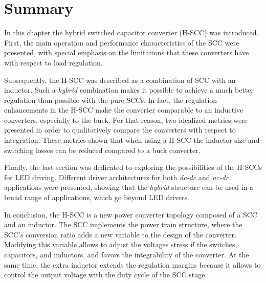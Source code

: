 \section{Summary}

In this chapter the hybrid switched capacitor converter (H-SCC) was introduced. First, the main operation and performance characteristics of the SCC were presented, with special emphasis on the limitations that these converters have with respect to load  regulation.

Subsequently, the H-SCC was described as a combination of SCC with an inductor. Such a \emph{hybrid} combination makes it possible to achieve a much better regulation than possible with the pure SCCs. In fact, the regulation enhancements in the H-SCC make the converter comparable to an inductive converters, especially to the buck. For that reason, two idealized metrics were presented in order to qualitatively compare the converters with respect to integration. These metrics shown that when using a H-SCC the inductor size and switching losses can be reduced compared to a buck converter.

Finally, the last section was dedicated to exploring the possibilities of the H-SCCs for LED driving. Different driver architectures for both \emph{dc-dc} and \emph{ac-dc} applications were presented, showing that the \emph{hybrid} structure can be used in a broad range of applications, which go beyond LED drivers.

In conclusion, the H-SCC is a new power converter topology composed of a SCC and an inductor. The SCC implements the power train structure, where the SCC's conversion ratio adds a new variable to the design of the converter. Modifying this variable allows to adjust the voltages stress if the switches, capacitors, and inductors, and favors the integrability of the converter. At the same time, the extra  inductor extends the regulation margins because it allows to control the output voltage with the duty cycle of the SCC stage.


\clearpage

 